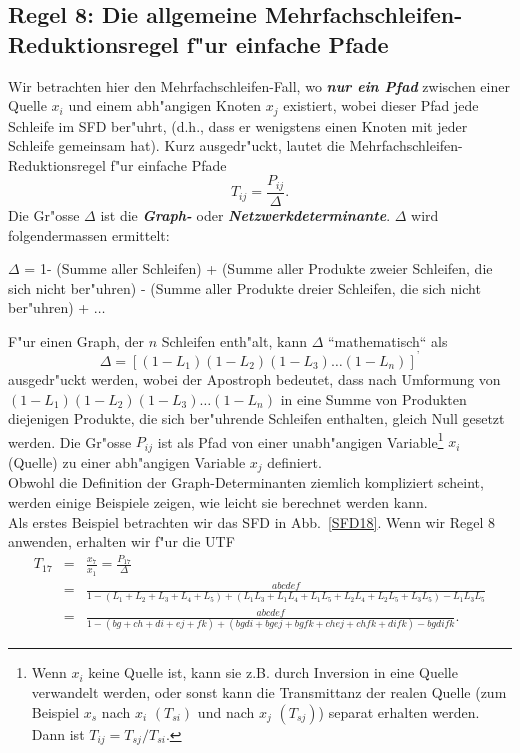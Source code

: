 \subsection{Regel 8: Die allgemeine Mehrfachschleifen-Reduktions\-regel f"ur
  einfache Pfade} Wir betrachten hier den Mehrfachschleifen-Fall, wo
\textbf{\emph{nur ein Pfad}} zwischen einer Quelle $x_i$ und einem abh"angigen Knoten
$x_j$ existiert, wobei dieser Pfad jede Schleife im SFD ber"uhrt,
(d.h., dass er wenigstens einen Knoten mit jeder Schleife gemeinsam
hat). Kurz ausgedr"uckt, lautet die Mehrfachschleifen-Reduktionsregel
f"ur einfache Pfade
\begin{equation}
 T_{ij} =   \frac{P_{ij}}{\Delta}.\label{mathSFD16b} 
\end{equation}
Die Gr"osse $\Delta$ ist die \textbf{\emph{Graph-}} oder \textbf{\emph{Netzwerkdeterminante}}.  $\Delta$ wird folgendermassen ermittelt:
\begin{DFrame}
$\Delta$ = 1- (Summe aller Schleifen\footnotemark) + (Summe aller Produkte zweier
Schleifen, die sich nicht ber"uhren) - (Summe
aller Produkte dreier Schleifen, die sich nicht ber"uhren) + $\ldots$ 
\end{DFrame}
  F"ur einen Graph,
der $n$ Schleifen enth"alt, kann $\Delta$ ``mathematisch`` als
\begin{equation}
 \Delta = [(1-L_1)(1-L_2)(1-L_3)\ldots (1-L_n)]^{\mbox{'}}
\end{equation}
ausgedr"uckt werden, wobei der Apostroph bedeutet, dass nach Umformung
von $(1-L_1)(1-L_2)(1-L_3)\ldots (1-L_n)$ in eine Summe von Produkten
diejenigen Produkte, die sich ber"uhrende Schleifen enthalten, gleich
Null gesetzt werden.  Die Gr"osse $P_{ij}$ ist als Pfad von einer
unabh"angigen Variable\footnote{Wenn $x_i$ keine Quelle ist, kann sie
  z.B. durch Inversion in eine Quelle
  verwandelt werden, oder sonst kann die Transmittanz der realen Quelle
  (zum Beispiel $x_s$ nach $x_i$ $(T_{si})$ und nach $x_j$
$(T_{sj})$) separat erhalten werden.  Dann ist
$T_{ij}=T_{sj}/T_{si}$.} $x_i$ (Quelle) zu einer abh"angigen Variable
$x_j$ definiert.\\  Obwohl die Definition der Graph-Determinanten
ziemlich kompliziert scheint, werden einige Beispiele zeigen, wie
leicht sie berechnet werden kann.\\  

\bsp{} Als erstes Beispiel betrachten wir das SFD in Abb.~\ref{SFD18}.
Wenn wir Regel 8 anwenden, erhalten wir f"ur die UTF
\begin{eqnarray*}
  T_{17} & = & \frac{x_7}{x_1} = \frac{P_{17}}{\Delta}\\
  & = & \textstyle\frac{abcdef}{1-(L_1 + L_2 + L_3 + L_4 + L_5) + (L_1L_3 + L_1L_4 + L_1L_5 + L_2L_4 + L_2L_5 + L_3L_5)- L_1L_3L_5}\\
  & = & \textstyle\frac{abcdef}{1 -(bg+ch+di+ej+fk)+(bgdi+bgej+bgfk+chej+chfk+difk)-bgdifk}.
\end{eqnarray*}

